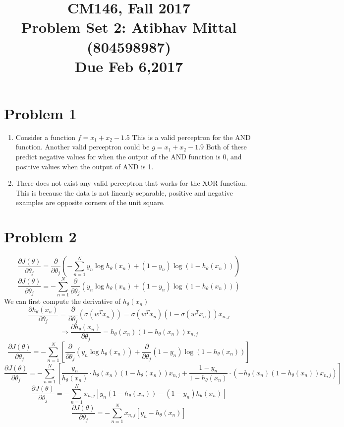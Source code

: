 \documentclass[11pt]{article}
\newcommand{\cnum}{CM146}
\newcommand{\ced}{Fall 2017}
\newcommand{\ctitle}[3]{\title{\vspace{-0.5in}\cnum, \ced\\Problem Set #1: #2\\Due #3}}
\newcommand{\solution}[1]{{{\color{blue}{\bf Solution:} {#1}}}}
\begin{document}
\ctitle{2}{Atibhav Mittal (804598987)}{Feb 6,2017}
\author{}
\date{}
\maketitle
\vspace{-0.75in}

\section{Problem 1}
\begin{enumerate}
\item 

\solution{} \newline
Consider a function $f = x_1 + x_2 - 1.5$ \newline
This is a valid perceptron for the AND function. \newline
Another valid perceptron could be $g = x_1 + x_2 - 1.9$ \newline
Both of these predict negative values for when the output of the AND function is 0, 
and positive values when the output of AND is 1.

\item 
\solution{} \newline
There does not exist any valid perceptron that works for the XOR function. \newline
This is because the data is not linearly separable, positive and negative examples
are opposite corners of the unit square.

\end{enumerate}

\newpage
\section{Problem 2}
\solution{} 
$$
\frac{\partial J(\theta)}{\partial \theta_j} = \frac{\partial}{\partial \theta_j} \left(- \sum_{n=1}^N y_n \log h_{\theta} (x_n) + (1 - y_n) \log (1 - h_{\theta} (x_n)) \right)
$$
$$
\frac{\partial J(\theta)}{\partial \theta_j} = - \sum_{n=1}^N \frac{\partial}{\partial \theta_j} \left( 
	y_n \log h_{\theta} (x_n) + (1 - y_n) \log (1 - h_{\theta} (x_n))
\right)
$$
We can first compute the derivative of $h_{\theta}(x_n)$
$$
	\frac{\partial h_{\theta}(x_n)}{\partial \theta_j} = \frac{\partial}{\partial \theta_j} (\sigma (w^T x_n)) = \sigma(w^T x_n) (1 - \sigma (w^T x_n)) x_{n,j}
$$
$$
\Rightarrow	\frac{\partial h_{\theta}(x_n)}{\partial \theta_j} = h_{\theta} (x_n) (1 - h_{\theta} (x_n)) x_{n,j}
$$
$$
\frac{\partial J(\theta)}{\partial \theta_j} = - \sum_{n=1}^N  \left[ 
	\frac{\partial}{\partial \theta_j} (y_n \log h_{\theta} (x_n) ) + \frac{\partial}{\partial \theta_j} ( 1 - y_n) \log (1 - h_{\theta} (x_n))
\right]
$$
$$
\frac{\partial J(\theta)}{\partial \theta_j} = - \sum_{n=1}^N  \left[ 
	\frac{y_n}{h_{\theta}(x_n)} \cdot h_{\theta} (x_n) (1 - h_{\theta} (x_n)) x_{n,j} + 
	\frac{1 - y_n}{1 - h_{\theta}(x_n)} \cdot (- h_{\theta} (x_n) (1 - h_{\theta} (x_n)) x_{n,j} )
\right]
$$
$$
\frac{\partial J(\theta)}{\partial \theta_j} = - \sum_{n=1}^N  x_{n,j} \left[ 
	y_n (1 - h_{\theta} (x_n)) - (1 - y_n) h_{\theta} (x_n) 
\right]
$$
$$
\frac{\partial J(\theta)}{\partial \theta_j} = - \sum_{n=1}^N  x_{n,j} \left[ 
	y_n - h_{\theta}(x_n)
\right]
$$
\newpage
\end{document}
